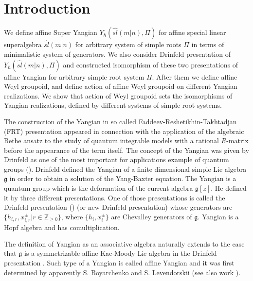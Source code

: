 \documentclass[english]{elsarticle}
\numberwithin{equation}{section}
\begin{document}
\section{Introduction}
We define affine Super Yangian $Y_{\hbar}(\hat{sl}(m|n), \Pi)$ for affine special linear superalgebra $\hat{sl}(m|n)$ for arbitrary system of simple roots $\Pi$ in terms of minimalistic system of generators. We also consider Drinfeld presentation of $Y_{\hbar}(\hat{sl}(m|n), \Pi)$ and constructed isomorphism of these two presentations of  affine Yangian for  arbitrary simple root system $\Pi$. After them  we define affine Weyl groupoid, and define action of affine Weyl groupoid on different Yangian realizations. We show that action of Weyl groupoid sets the isomorphisms of Yangian realizations, defined by different systems of simple root systems.

The construction of the Yangian in so called Faddeev-Reshetikhin-Takhtadjan (FRT) presentation appeared in connection with the application of the algebraic Bethe ansatz to the study of quantum integrable models with a rational $R$-matrix before the appearance of the term itself. The concept of the Yangian was given by Drinfeld as one of the most important for applications example of quantum groups (\cite{Dr}). Drinfeld defined the Yangian of a finite dimensional simple Lie algebra $\mathfrak{g}$ in order to obtain a solution of the Yang-Baxter equation. The Yangian is a quantum group which is the deformation of the current algebra $\mathfrak{g}[z]$. He defined it by three different presentations. One of those presentations is called the Drinfeld presentation (\cite{Drinfeld}) (or new Drinfeld presentation) whose generators are $\{h_{i,r}, x^{\pm}_{i,r}| r\in \mathbb{Z}_{\geq 0}\}$, where $\{h_i, x^{\pm}_i\}$ are Chevalley generators of $\mathfrak{g}$. Yangian is a Hopf algebra and has comultiplication.

The definition of Yangian as an associative algebra naturally extends to the case that $\mathfrak{g}$ is a symmetrizable affine Kac-Moody Lie algebra in the Drinfeld presentation \cite{Drinfeld}. Such type of a Yangian is called affine Yangian and it was first determined by apparently S. Boyarchenko and S. Levendorskii \cite{Levendorski} (see also work \cite{Guaywork}).
\end{document}
